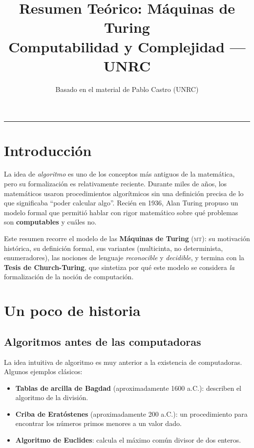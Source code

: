 \documentclass[11pt,a4paper]{article}
\title{\textbf{Resumen Teórico: Máquinas de Turing}\\[0.3em]
\large Computabilidad y Complejidad --- UNRC}
\author{Basado en el material de Pablo Castro (UNRC)}
\date{}
\theoremstyle{definicion}
\newcommand{\MT}{\textsc{mt}}
\begin{document}
\maketitle

\tableofcontents

\vspace{1em}
\hrule
\vspace{1em}

\section{Introducción}

La idea de \emph{algoritmo} es uno de los conceptos más antiguos de la matemática, pero su formalización es relativamente reciente. Durante miles de años, los matemáticos usaron procedimientos algorítmicos sin una definición precisa de lo que significaba ``poder calcular algo''. Recién en 1936, Alan Turing propuso un modelo formal que permitió hablar con rigor matemático sobre qué problemas son \textbf{computables} y cuáles no.

Este resumen recorre el modelo de las \textbf{Máquinas de Turing} (\MT): su motivación histórica, su definición formal, sus variantes (multicinta, no determinista, enumeradores), las nociones de lenguaje \emph{reconocible} y \emph{decidible}, y termina con la \textbf{Tesis de Church-Turing}, que sintetiza por qué este modelo se considera \emph{la} formalización de la noción de computación.

\section{Un poco de historia}

\subsection{Algoritmos antes de las computadoras}

La idea intuitiva de algoritmo es muy anterior a la existencia de computadoras. Algunos ejemplos clásicos:

\begin{itemize}
    \item \textbf{Tablas de arcilla de Bagdad} (aproximadamente 1600 a.C.): describen el algoritmo de la división.
    \item \textbf{Criba de Eratóstenes} (aproximadamente 200 a.C.): un procedimiento para encontrar los números primos menores a un valor dado.
    \item \textbf{Algoritmo de Euclides}: calcula el máximo común divisor de dos enteros.
\end{itemize}
\end{document}
